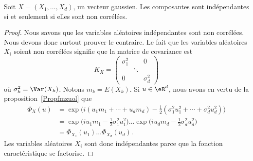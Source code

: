 \begin{theorem} \label{ThoPRkxPdQ}
	Soit \( X=(X_1,\ldots, X_d)\), un vecteur gaussien. Les composantes sont indépendantes si et seulement si elles sont non corrélées.
\end{theorem}

\begin{proof}
	Nous savons que les variables aléatoires indépendantes sont non corrélées. Nous devons donc surtout prouver le contraire. Le fait que les variables aléatoires \( X_i\) soient non corrélées signifie que la matrice de covariance est
	\begin{equation}
		K_X=\begin{pmatrix}
			\sigma_1^2 &        & 0          \\
			           & \ddots &            \\
			0          &        & \sigma_d^2
		\end{pmatrix}
	\end{equation}
	où \( \sigma_k^2=\Var(X_k)\). Notons \( m_k=E(X_k)\). Si \( u\in \eR^d\), nous avons en vertu de la proposition~\ref{Propfmzuol} que
	\begin{subequations}
		\begin{align}
			\Phi_X(u) & =\exp\Big( i(u_1m_1+\cdots +u_dm_d)-\frac{ 1 }{2}(\sigma_1^2u_1^2+\cdots +\sigma_d^2u_d^2) \Big)                \\
			          & =\exp\big( iu_1m_1-\frac{ 1 }{2}\sigma_1^2u_1^2 \big)\ldots\exp\big( iu_dm_d-\frac{ 1 }{2}\sigma_d^2u_d^2 \big) \\
			          & =\Phi_{X_1}(u_1)\ldots \Phi_{X_d}(u_d).
		\end{align}
	\end{subequations}
	Les variables aléatoires \( X_i\) sont donc indépendantes parce que la fonction caractéristique se factorise.
\end{proof}

